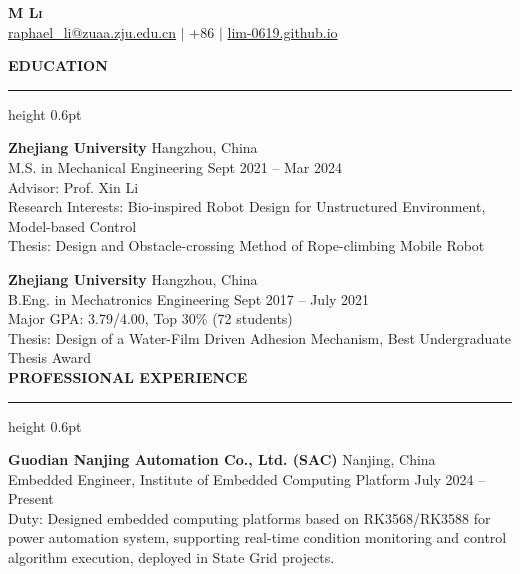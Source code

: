 \documentclass[10pt,a4paper]{article}
\renewcommand{\section}[1]{
    \vspace{8pt}
    \noindent\textbf{\large\rmfamily\textcolor{sectionblue}{\MakeUppercase{#1}}}
    \vspace{4pt}
    \hrule height 0.6pt
    \vspace{8pt}
}
\begin{document}
\begin{center}
    {\huge\bfseries\rmfamily\textsc{M Li}} \\[4pt]
    \href{mailto:raphael_li@zuaa.zju.edu.cn}{raphael\_li@zuaa.zju.edu.cn} $\vert$ 
    {+86 } $\vert$
    \href{https://lim-0619.github.io/}{lim-0619.github.io}
\end{center}
\vspace{-4pt}  %
\section{Education}
\noindent
\textbf{Zhejiang University} \hfill Hangzhou, China \\
M.S. in Mechanical Engineering \hfill Sept 2021 -- Mar 2024 \\
Advisor: Prof. Xin Li\\
Research Interests: Bio-inspired Robot Design for Unstructured Environment, Model-based Control\\
Thesis: Design and Obstacle-crossing Method of Rope-climbing Mobile Robot 

\vspace{6pt}
\noindent
\textbf{Zhejiang University} \hfill Hangzhou, China \\
B.Eng. in Mechatronics Engineering \hfill Sept 2017 -- July 2021 \\
Major GPA: 3.79/4.00, Top 30\% (72 students) \\
Thesis: Design of a Water-Film Driven Adhesion Mechanism, Best Undergraduate Thesis Award\\

\section{Professional Experience}
\noindent
\textbf{Guodian Nanjing Automation Co., Ltd. (SAC)} \hfill Nanjing, China \\
Embedded Engineer, Institute of Embedded Computing Platform \hfill July 2024 -- Present\\
Duty: Designed embedded computing platforms based on RK3568/RK3588
for power automation system, supporting real-time condition monitoring and control algorithm execution, deployed in State Grid projects.\\
\end{document}
